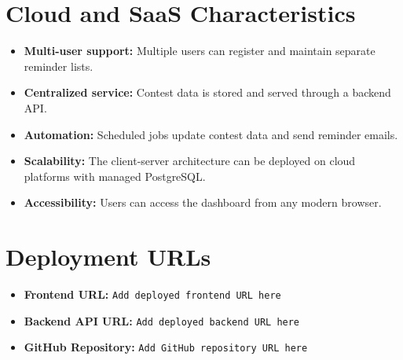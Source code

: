 \documentclass[12pt,a4paper]{report}
\begin{document}
\begin{normalsize}
\section{Cloud and SaaS Characteristics}

\begin{itemize}
    \item \textbf{Multi-user support:} Multiple users can register and maintain separate reminder lists.
    \item \textbf{Centralized service:} Contest data is stored and served through a backend API.
    \item \textbf{Automation:} Scheduled jobs update contest data and send reminder emails.
    \item \textbf{Scalability:} The client-server architecture can be deployed on cloud platforms with managed PostgreSQL.
    \item \textbf{Accessibility:} Users can access the dashboard from any modern browser.
\end{itemize}

\section{Deployment URLs}

\begin{itemize}
    \item \textbf{Frontend URL:} \texttt{Add deployed frontend URL here}
    \item \textbf{Backend API URL:} \texttt{Add deployed backend URL here}
    \item \textbf{GitHub Repository:} \texttt{Add GitHub repository URL here}
\end{itemize}

\end{normalsize}
\end{document}
